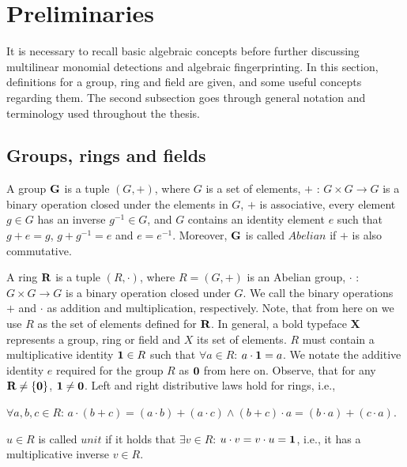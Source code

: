 \section{Preliminaries}

It is necessary to recall basic algebraic concepts 
before further discussing multilinear monomial detections and algebraic fingerprinting. 
In this section, definitions for a group, ring and field are given, and some useful concepts 
regarding them. The second subsection goes through general notation and terminology used 
throughout the thesis.

\subsection{Groups, rings and fields} %

A group $\textbf G$ is a tuple $(G, +)$, where $G$ is a set of elements, $+$ : $G \times G \longrightarrow G$ is a binary operation closed under 
the elements in $G$, $+$ is associative, every element $g\in G$ has an inverse $g^{-1}\in G$, and $G$ contains 
an identity element $e$ such that $g + e = g$, $g + g^{-1} = e$ and $e = e^{-1}$. Moreover, $\textbf G$ is called $Abelian$ if 
$+$ is also commutative.\nl

A ring $\textbf R$ is a tuple $(R, \cdot )$, where $R = (G, +)$ is an Abelian group, $\cdot$ : $G \times G \longrightarrow G$ 
is a binary operation closed under $G$. We call the binary operations $+$ and $\cdot$ as addition and multiplication, respectively. 
Note, that from here on we use $R$ as the set of elements defined for $\textbf R$. 
In general, a bold typeface \textbf X represents a group, ring or field and $X$ its set of elements. 
$R$ must contain a multiplicative identity $\textbf 1 \in R$ such that $\forall a \in R$: $a \cdot \textbf 1 = a$. 
We notate the additive identity $e$ required for the group $R$ as $\textbf 0$ from here on. 
Observe, that for any $\textbf R \neq \{\textbf 0\}$, $\textbf 1 \neq \textbf 0$.  
Left and right distributive laws hold for rings, i.e., 
\begin{center}
  $\forall a, b, c \in R$: $a \cdot (b + c) = (a \cdot b) + (a \cdot c) \land (b + c) \cdot a = (b \cdot a) + (c \cdot a)$.
\end{center}
$u \in R$ is called $unit$ if it holds that $\exists v \in R$: $u \cdot v = v \cdot u = \textbf 1$, 
i.e., it has a multiplicative inverse $v \in R$.\nl

